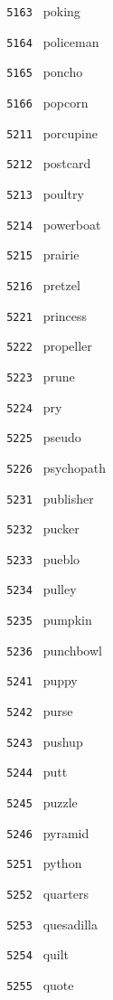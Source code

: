 \documentclass[11pt]{article}
\begin{document}
\begin{multicols}{6}
\noindent \texttt{ 5163 } poking  \par
\noindent \texttt{ 5164 } policeman  \par
\noindent \texttt{ 5165 } poncho  \par
\noindent \texttt{ 5166 } popcorn  \par
\noindent \texttt{ 5211 } porcupine  \par
\noindent \texttt{ 5212 } postcard  \par
\noindent \texttt{ 5213 } poultry  \par
\noindent \texttt{ 5214 } powerboat  \par
\noindent \texttt{ 5215 } prairie  \par
\noindent \texttt{ 5216 } pretzel  \par
\noindent \texttt{ 5221 } princess  \par
\noindent \texttt{ 5222 } propeller  \par
\noindent \texttt{ 5223 } prune  \par
\noindent \texttt{ 5224 } pry  \par
\noindent \texttt{ 5225 } pseudo  \par
\noindent \texttt{ 5226 } psychopath  \par
\noindent \texttt{ 5231 } publisher  \par
\noindent \texttt{ 5232 } pucker  \par
\noindent \texttt{ 5233 } pueblo  \par
\noindent \texttt{ 5234 } pulley  \par
\noindent \texttt{ 5235 } pumpkin  \par
\noindent \texttt{ 5236 } punchbowl  \par
\noindent \texttt{ 5241 } puppy  \par
\noindent \texttt{ 5242 } purse  \par
\noindent \texttt{ 5243 } pushup  \par
\noindent \texttt{ 5244 } putt  \par
\noindent \texttt{ 5245 } puzzle  \par
\noindent \texttt{ 5246 } pyramid  \par
\noindent \texttt{ 5251 } python  \par
\noindent \texttt{ 5252 } quarters  \par
\noindent \texttt{ 5253 } quesadilla  \par
\noindent \texttt{ 5254 } quilt  \par
\noindent \texttt{ 5255 } quote  \par

\end{multicols}
\end{document}
